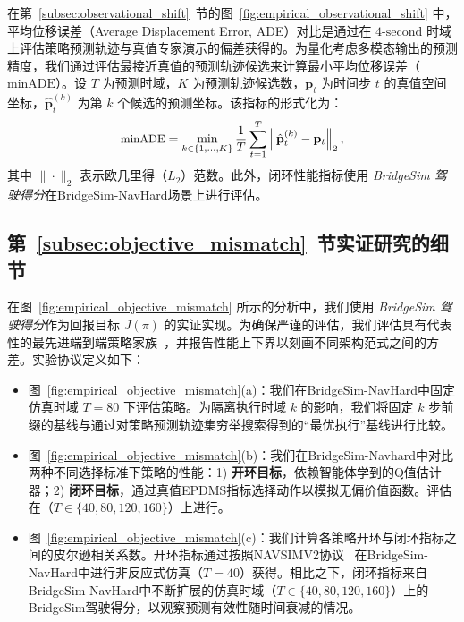 \documentclass{article}
\begin{document}
在第~\ref{subsec:observational_shift}~节的图~\ref{fig:empirical_observational_shift} 中，平均位移误差（Average Displacement Error, ADE）对比是通过在 $4\text{-second}$ 时域上评估策略预测轨迹与真值专家演示的偏差获得的。为量化考虑多模态输出的预测精度，我们通过评估最接近真值的预测轨迹候选来计算最小平均位移误差（$\text{minADE}$）。设 $T$ 为预测时域，$K$ 为预测轨迹候选数，$\mathbf{p}_t$ 为时间步 $t$ 的真值空间坐标，$\hat{\mathbf{p}}_t^{(k)}$ 为第 $k$ 个候选的预测坐标。该指标的形式化为：
\begin{equation}
\small
    \text{minADE} = \min_{k \in \{1, \dots, K\}} \frac{1}{T} \sum_{t=1}^{T} \left\| \hat{\mathbf{p}}_t^{(k)} - \mathbf{p}_t \right\|_2,
\end{equation}
其中 $\| \cdot \|_2$ 表示欧几里得（$L_2$）范数。此外，闭环性能指标使用 \textit{BridgeSim 驾驶得分}在BridgeSim-NavHard场景上进行评估。

\subsection{第~\ref{subsec:objective_mismatch}~节实证研究的细节}
\label{appendix:objective_mismatch_details}

在图~\ref{fig:empirical_objective_mismatch} 所示的分析中，我们使用 \textit{BridgeSim 驾驶得分}作为回报目标 $J(\pi)$ 的实证实现。为确保严谨的评估，我们评估具有代表性的最先进端到端策略家族~\cite{transfuser, diffusiondrive, diffusiondrivev2, RAP, DrivoR}，并报告性能上下界以刻画不同架构范式之间的方差。实验协议定义如下：
\begin{itemize}
    \item 图~\ref{fig:empirical_objective_mismatch}(a)：我们在BridgeSim-NavHard中固定仿真时域 $T=80$ 下评估策略。为隔离执行时域 $k$ 的影响，我们将固定 $k$ 步前缀的基线与通过对策略预测轨迹集穷举搜索得到的“最优执行”基线进行比较。
    \item 图~\ref{fig:empirical_objective_mismatch}(b)：我们在BridgeSim-Navhard中对比两种不同选择标准下策略的性能：1) \textbf{开环目标}，依赖智能体学到的Q值估计器；2) \textbf{闭环目标}，通过真值EPDMS指标选择动作以模拟无偏价值函数。评估在（$T \in \{40, 80, 120, 160\}$）上进行。
    \item 图~\ref{fig:empirical_objective_mismatch}(c)：我们计算各策略开环与闭环指标之间的皮尔逊相关系数。开环指标通过按照NAVSIMV2协议~\cite{navsimv2} 在BridgeSim-NavHard中进行非反应式仿真（$T=40$）获得。相比之下，闭环指标来自BridgeSim-NavHard中不断扩展的仿真时域（$T \in \{40, 80, 120, 160\}$）上的BridgeSim驾驶得分，以观察预测有效性随时间衰减的情况。
\end{itemize}
\end{document}
